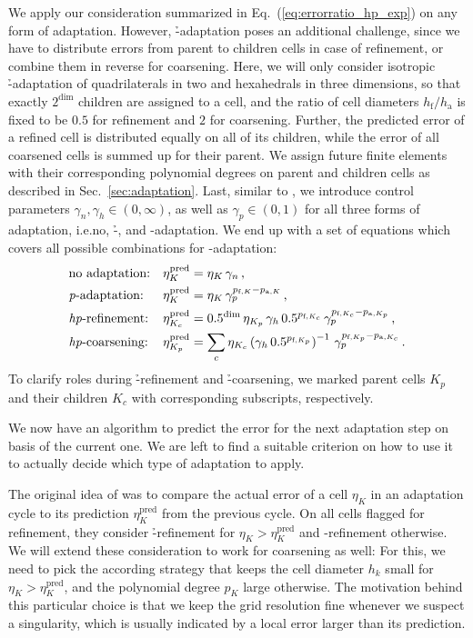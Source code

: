We apply our consideration summarized in Eq.~(\ref{eq:errorratio_hp_exp}) on any form of adaptation. However, \h-adaptation poses an additional challenge, since we have to distribute errors from parent to children cells in case of refinement, or combine them in reverse for coarsening. Here, we will only consider isotropic \h-adaptation of quadrilaterals in two and hexahedrals in three dimensions, so that exactly $2^\text{dim}$ children are assigned to a cell, and the ratio of cell diameters $h_\text{f} / h_\text{a}$ is fixed to be $0.5$ for refinement and $2$ for coarsening. Further, the predicted error of a refined cell is distributed equally on all of its children, while the error of all coarsened cells is summed up for their parent. We assign future finite elements with their corresponding polynomial degrees on parent and children cells as described in Sec.~\ref{sec:adaptation}. Last, similar to \textcite{melenk2001}, we introduce control parameters $\gamma_n, \gamma_h \in (0, \infty)$, as well as $\gamma_p \in (0,1)$ for all three forms of adaptation, i.e.\@ no, \h-, and \p-adaptation. We end up with a set of equations which covers all possible combinations for \hp-adaptation:
\begin{align}
&\text{no adaptation:} & \eta^\text{pred}_K &= \eta_K \, \gamma_n \,\text{,} \\
&\text{\textit{p}-adaptation:} & \eta^\text{pred}_K &= \eta_K \, \gamma_p^{p_{\text{f},K} - p_{\text{a},K}} \,\text{,} \\
&\text{\textit{hp}-refinement:} &\eta^\text{pred}_{K_c} &= 0.5^{\text{dim}} \, \eta_{K_p} \, \gamma_h \, 0.5^{p_{\text{f},K_c}} \, \gamma_p^{p_{\text{f},K_c} - p_{\text{a},K_p}} \,\text{,} \\
&\text{\textit{hp}-coarsening:} & \eta^\text{pred}_{K_p} &= \sum\limits_{c} \eta_{K_c} \left( \gamma_h \, 0.5^{p_{\text{f},K_p}} \right)^{-1} \, \gamma_p^{p_{\text{f},K_p} - p_{\text{a},K_c}} \,\text{.} 
\end{align}
To clarify roles during \h-refinement and \h-coarsening, we marked parent cells $K_p$ and their children $K_c$ with corresponding subscripts, respectively.

We now have an algorithm to predict the error for the next adaptation step on basis of the current one. We are left to find a suitable criterion on how to use it to actually decide which type of adaptation to apply.

The original idea of \cite{melenk2001} was to compare the actual error of a cell $\eta_K$ in an adaptation cycle to its prediction $\eta_K^\text{pred}$ from the previous cycle. On all cells flagged for refinement, they consider \h-refinement for $\eta_K > \eta_K^\text{pred}$ and \p-refinement otherwise. We will extend these consideration to work for coarsening as well: For this, we need to pick the according strategy that keeps the cell diameter $h_k$ small for $\eta_K > \eta_K^\text{pred}$, and the polynomial degree $p_K$ large otherwise. The motivation behind this particular choice is that we keep the grid resolution fine whenever we suspect a singularity, which is usually indicated by a local error larger than its prediction.

